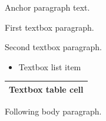 \documentclass[11pt,a4paper]{article}
\begin{document}
Anchor paragraph text.

First textbox paragraph.

Second textbox paragraph.

\begin{itemize}
\item Textbox list item
\end{itemize}

\begin{table}[h]
\begin{tabular}{|l|}
\hline
Textbox table cell \\ \hline
\end{tabular}
\end{table}

Following body paragraph.
\end{document}
